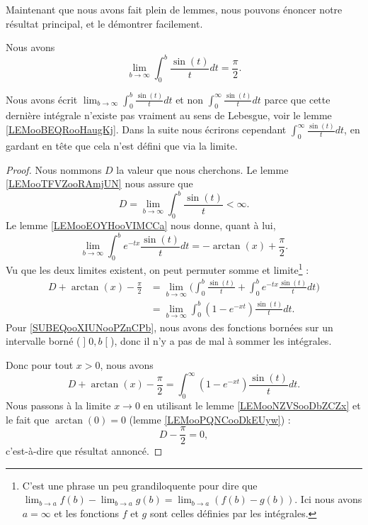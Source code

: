 Maintenant que nous avons fait plein de lemmes, nous pouvons énoncer notre résultat principal, et le démontrer facilement.

\begin{theorem}
	Nous avons
	\begin{equation}
		\lim_{b\to \infty} \int_0^b\frac{ \sin(t) }{ t }dt=\frac{ \pi }{2}.
	\end{equation}
\end{theorem}

Nous avons écrit \( \lim_{b\to \infty} \int_0^b\frac{ \sin(t) }{ t }dt\) et non \( \int_0^{\infty}\frac{ \sin(t) }{ t }dt\) parce que cette dernière intégrale n'existe pas vraiment au sens de Lebesgue, voir le lemme \ref{LEMooBEQRooHaugKj}. Dans la suite nous écrirons cependant \( \int_0^{\infty}\frac{ \sin(t) }{ t }dt\), en gardant en tête que cela n'est défini que via la limite.

\begin{proof}
	Nous nommons \( D\) la valeur que nous cherchons. Le lemme \ref{LEMooTFVZooRAmjUN} nous assure que
	\begin{equation}
		D=\lim_{b\to \infty} \int_0^b\frac{ \sin(t) }{ t }<\infty.
	\end{equation}
	Le lemme \ref{LEMooEOYHooVIMCCa} nous donne, quant à lui,
	\begin{equation}
		\lim_{b\to \infty} \int_0^b e^{-tx}\frac{ \sin(t) }{ t }dt=-\arctan(x)+\frac{ \pi }{2}.
	\end{equation}
	Vu que les deux limites existent, on peut permuter somme et limite\footnote{C'est une phrase un peu grandiloquente pour dire que \( \lim_{b\to a} f(b)-\lim_{b\to a} g(b)=\lim_{b\to a} (f(b)-g(b))  \). Ici nous avons \( a=\infty\) et les fonctions \( f\) et \( g\) sont celles définies par les intégrales.} :
	\begin{subequations}
		\begin{align}
			D+\arctan(x)-\frac{ \pi }{2} & =\lim_{b\to \infty} \big(    \int_0^b\frac{ \sin(t) }{ t } +  \int_0^b e^{-tx}\frac{ \sin(t) }{ t }dt  \big) \\
			                             & =\lim_{b\to \infty} \int_0^b(1- e^{-xt})\frac{ \sin(t) }{ t }dt.    \label{SUBEQooXIUNooPZnCPb}
		\end{align}
	\end{subequations}
	Pour \eqref{SUBEQooXIUNooPZnCPb}, nous avons des fonctions bornées sur un intervalle borné (\( \mathopen] 0 , b \mathclose[\)), donc il n'y a pas de mal à sommer les intégrales.

	Donc pour tout \( x>0\), nous avons
	\begin{equation}
		D+\arctan(x)-\frac{ \pi }{2}=\int_0^{\infty}(1- e^{-xt})\frac{ \sin(t) }{ t }dt.
	\end{equation}
	Nous passons à la limite \( x\to 0\) en utilisant le lemme \ref{LEMooNZVSooDbZCZx} et le fait que \( \arctan(0)=0\) (lemme \ref{LEMooPQNCooDkEUyw}) :
	\begin{equation}
		D-\frac{ \pi }{2}=0,
	\end{equation}
	c'est-à-dire que résultat annoncé.
\end{proof}
